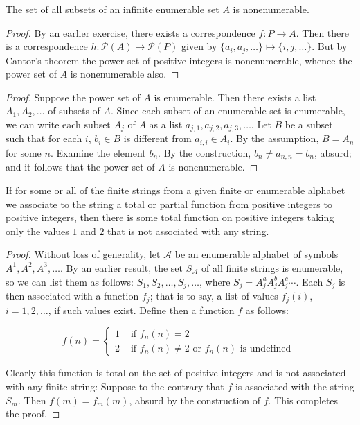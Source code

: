 \begin{exercise}[2.1]
  The set of all subsets of an infinite enumerable set $A$ is nonenumerable.
\end{exercise}
\begin{proof}
  By an earlier exercise, there exists a correspondence $f\colon P \to A$.
  Then there is a correspondence $h\colon \mathcal P(A) \to \mathcal P(P)$ given by $\{a_i, a_j, \ldots\} \mapsto \{i, j, \ldots\}$.
  But by Cantor's theorem the power set of positive integers is nonenumerable, whence the power set of $A$ is nonenumerable also.
\end{proof}
\begin{proof}
  Suppose the power set of $A$ is enumerable.
  Then there exists a list $A_1,A_2,\ldots$ of subsets of $A$.
  Since each subset of an enumerable set is enumerable, we can write each subset $A_j$ of $A$ as a list $a_{j,1},a_{j,2},a_{j,3},\ldots$.
  Let $B$ be a subset such that for each $i$, $b_i \in B$ is different from $a_{i,i} \in A_i$.
  By the assumption, $B = A_n$ for some $n$.
  Examine the element $b_n$.
  By the construction, $b_n \ne a_{n,n} = b_n$, absurd; and it follows that the power set of $A$ is nonenumerable.
\end{proof}

\begin{exercise}[2.2]
  If for some or all of the finite strings from a given finite or enumerable alphabet we associate to the string a total or partial function from positive integers to positive integers, then there is some total function on positive integers taking only the values $1$ and $2$ that is not associated with any string.
\end{exercise}
\begin{proof}
  Without loss of generality, let $\mathcal A$ be an enumerable alphabet of symbols $A^1, A^2, A^3, \ldots$.
  By an earlier result, the set $S_{\mathcal A}$ of all finite strings is enumerable, so we can list them as follows: $S_1, S_2, \ldots, S_j, \ldots$, where $S_j = A_j^aA_j^bA_j^c\cdots$.
  Each $S_j$ is then associated with a function $f_j$; that is to say, a list of values $f_j(i)$, $i = 1, 2, \ldots$, if such values exist.
  Define then a function $f$ as follows:

  \begin{equation*}
    f(n) = \begin{cases}
      1 &\text{ if } f_n(n) = 2 \\
      2 &\text{ if } f_n(n) \ne 2 \text{ or } f_n(n) \text{ is undefined }
    \end{cases}
  \end{equation*}

  Clearly this function is total on the set of positive integers and is not associated with any finite string: Suppose to the contrary that $f$ is associated with the string $S_m$.
  Then $f(m) = f_m(m)$, absurd by the construction of $f$.
  This completes the proof.
\end{proof}

